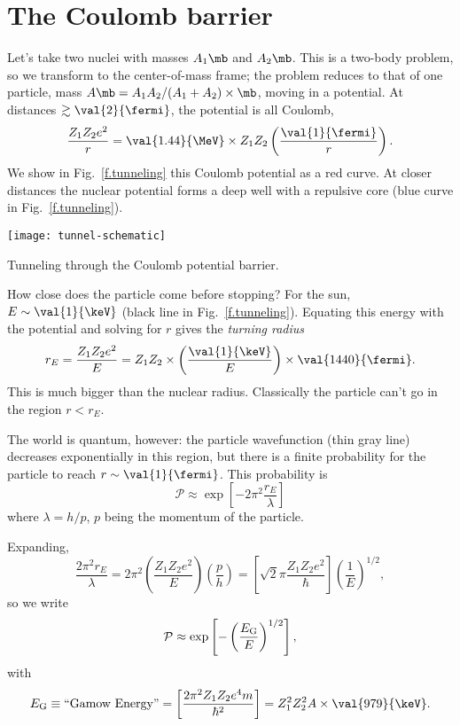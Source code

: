 
\section{The Coulomb barrier}

Let's take two nuclei with masses $A_{1}\mb$ and $A_{2}\mb$. This is a two-body problem, so we transform to the center-of-mass frame; the problem reduces to that of one particle, mass $A\mb = A_{1}A_{2}/(A_{1}+A_{2})\times\mb$, moving in a potential.  At distances $\gtrsim \val{2}{\fermi}$, the potential is all Coulomb,
\[ \frac{Z_{1}Z_{2}e^{2}}{r} = \val{1.44}{\MeV}\times Z_{1}Z_{2}\left(\frac{\val{1}{\fermi}}{r}\right). \]
We show in Fig.~\ref{f.tunneling} this Coulomb potential as a red curve.
At closer distances the nuclear potential forms a deep well with a repulsive core (blue curve in Fig.~\ref{f.tunneling}).

\begin{marginfigure}
\texttt{[image: tunnel-schematic]}
\caption{Tunneling through the Coulomb potential barrier.}
\label{f.tunneling}
\end{marginfigure}

 How close does the particle come before stopping? For the sun, $E \sim \val{1}{\keV}$ (black line in Fig.~\ref{f.tunneling}).  Equating this energy with the potential and solving for $r$ gives the \emph{turning radius}
\begin{equation}
	r_{E} = \frac{Z_{1}Z_{2}e^{2}}{E} = Z_{1}Z_{2}\times \left(\frac{\val{1}{\keV}}{E}\right) \times \val{1440}{\fermi}.
\end{equation}
This is much bigger than the nuclear radius.  Classically the particle can't go in the region $r<r_{E}$.

The world is quantum, however: the particle wavefunction (thin gray line) decreases exponentially in this region, but there is a finite probability for the particle to reach $r\sim\val{1}{\fermi}$.  This probability is
\[ \mathcal{P}\approx \exp\left[-2\pi^{2}\frac{r_{E}}{\lambda}\right] \]
where $\lambda = h/p$, $p$ being the momentum of the particle.

Expanding,
\[ \frac{2\pi^{2}r_{E}}{\lambda} = 2\pi^{2}\left(\frac{Z_{1}Z_{2}e^{2}}{E}\right)
	\left(\frac{p}{h}\right) = \left[\sqrt{2}\pi \frac{Z_{1}Z_{2}e^{2}}{\hbar}\right]\left(\frac{1}{E}\right)^{1/2}, \]
so we write
\begin{equation}
\mathcal{P} \approx \exp\left[-\left(\frac{E_{\mathrm{G}}}{E}\right)^{1/2}\right],
\end{equation}
with
\[ \EG \equiv \textrm{``Gamow Energy''} = \left[\frac{2\pi^{2}Z_{1}Z_{2}e^{4}m}{\hbar^{2}}\right] = Z_{1}^{2}Z_{2}^{2}A \times \val{979}{\keV}.
\]

